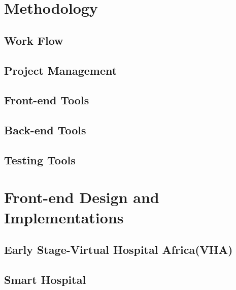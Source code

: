 %
%
\chapter{Methodology}
\label{chap:D&I}

\section{Work Flow}
\label{subsec:subsec01}

\section{Project Management}
\label{subsec:PM}



\section{Front-end Tools}
\label{subsec:FETools}


\section{Back-end Tools}
\label{subsec:BETools}




\section{Testing Tools}
\label{subsec:subsec05}

\chapter{Front-end Design and Implementations}
\label{sec:sec02}

\section{Early Stage-Virtual Hospital Africa(VHA)}
\label{subsec:subsec01}
\section{}



\section{Smart Hospital}
\label{subsec:subsec02}


